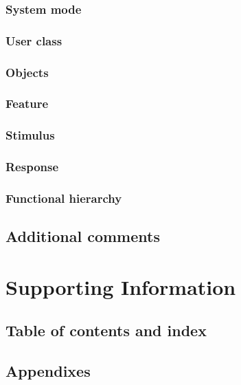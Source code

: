 \documentclass[onecolumn, draftclsnofoot,10pt, compsoc]{IEEEtran}
\begin{document}
\subsubsection{System mode}

\subsubsection{User class}

\subsubsection{Objects}

\subsubsection{Feature}

\subsubsection{Stimulus}

\subsubsection{Response}

\subsubsection{Functional hierarchy}

\subsection{Additional comments}

\section{Supporting Information}

\subsection{Table of contents and index}

\subsection{Appendixes}
\end{document}
